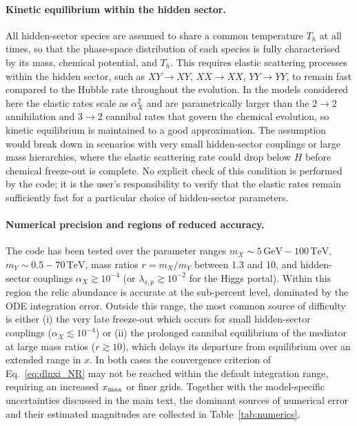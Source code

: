\documentclass[11pt]{article}
\numberwithin{equation}{section}
\newcommand{\GeV}{\,\text{GeV}}
\newcommand{\TeV}{\,\text{TeV}}
\newcommand{\TD}{T_h}
\newcommand{\mX}{m_X}
\newcommand{\mY}{m_Y}
\newcommand{\alphaX}{\alpha_X}
\begin{document}
\paragraph{Kinetic equilibrium within the hidden sector.}
All hidden-sector species are assumed to share a common temperature $\TD$ at all times, so that the phase-space distribution of each species is fully characterised by its mass, chemical potential, and $\TD$. This requires elastic scattering processes within the hidden sector, such as $XY \to XY$, $XX \to XX$, $YY \to YY$, to remain fast compared to the Hubble rate throughout the evolution. In the models considered here the elastic rates scale as $\alphaX^2$ and are parametrically larger than the $2\to2$ annihilation and $3\to2$ cannibal rates that govern the chemical evolution, so kinetic equilibrium is maintained to a good approximation. The assumption would break down in scenarios with very small hidden-sector couplings or large mass hierarchies, where the elastic scattering rate could drop below $H$ before chemical freeze-out is complete. No explicit check of this condition is performed by the code; it is the user's responsibility to verify that the elastic rates remain sufficiently fast for a particular choice of hidden-sector parameters.
 
\paragraph{Numerical precision and regions of reduced accuracy.}
The code has been tested over the parameter ranges $\mX\sim5\GeV-100\TeV$, $\mY\sim 0.5-70\TeV$, mass ratios $r=\mX/\mY$ between
1.3 and 10, and hidden-sector couplings $\alphaX\gtrsim 10^{-4}$ (or $\lambda_{s,p} \gtrsim 10^{-2}$ for the Higgs portal). Within this region the relic abundance is accurate at the sub-percent level, dominated by the ODE integration error. Outside this range, the most common source of difficulty is either (i) the very late freeze-out which occurs for small hidden-sector couplings ($\alphaX \lesssim 10^{-4}$) or (ii) the prolonged cannibal equilibrium of the mediator at large mass ratios ($r \gtrsim 10$), which delays its departure from equilibrium over an extended range in $x$. In both cases the convergence criterion of Eq.~\eqref{eq:dlnxi_NR} may not be reached within the default integration range, requiring an increased $x_{\rm max}$ or finer grids. Together with the model-specific uncertainties discussed in the main text, the dominant sources of numerical error and their estimated magnitudes are collected in Table~\ref{tab:numerics}.
\end{document}
